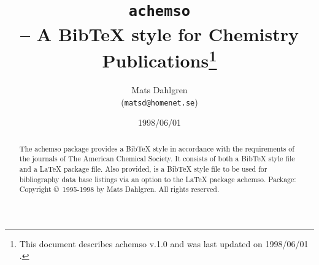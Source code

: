 \documentclass{article}
\begin{document}
\title{\texttt{achemso}\\
-- A BibTeX style for Chemistry Publications\thanks{%
This document describes \textsf{achemso} v.1.0{} and was last updated on
1998/06/01 .}}
\author{Mats Dahlgren \\
(\texttt{matsd@homenet.se})}
\date{1998/06/01}
\maketitle

\begin{abstract}
The \textsf{achemso} package provides a BibTeX style in accordance with the
requirements of the journals of The American Chemical Society. It consists
of both a BibTeX style file and a LaTeX package file. Also provided, is a
BibTeX style file to be used for bibliography data base listings via an
option to the LaTeX package \textsf{achemso}. \newline
Package: Copyright \copyright\ 1995-1998 by Mats Dahlgren. All rights
reserved.
\end{abstract}

\cite{AGPCoherent}\cite{Weiner98}


\end{document}
